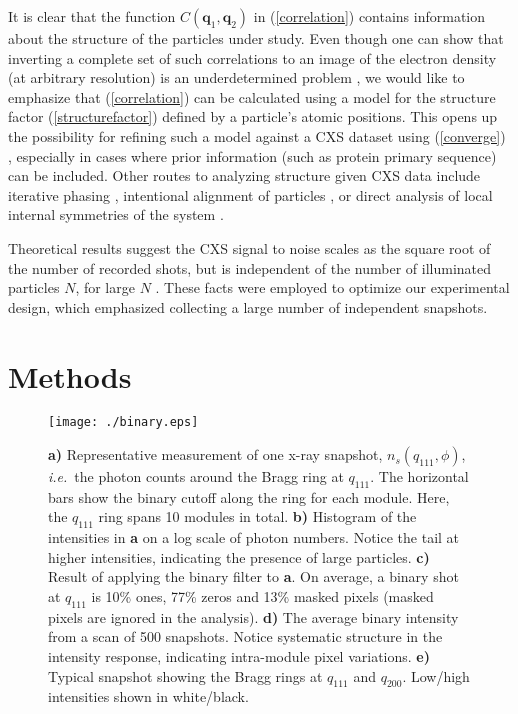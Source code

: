 \documentclass [11pt,fleqn]{article}
\begin{document}
It is clear that the function $C(\bm q_1, \bm q_2)$ in (\ref{correlation}) contains information about the structure of the particles under study. Even though one can show that inverting a complete set of such correlations to an image of the electron density (at arbitrary resolution) is an underdetermined problem \cite{Elser:2011ez}, we would like to emphasize that (\ref{correlation}) can be calculated using a model for the structure factor (\ref{structurefactor}) defined by a particle's atomic positions. This opens up the possibility for refining such a model against a CXS dataset using (\ref{converge}) \cite{Liu:2013dv, Chen:2013io, Saldin:2009jj}, especially in cases where prior information (such as protein primary sequence) can be included. Other routes to analyzing structure given CXS data include iterative phasing \cite{Saldin:2010bx}, intentional alignment of particles \cite{Poon:2013ia}, or direct analysis of local internal symmetries of the system \cite{Kurta:2012cb, Kurta:2013to}.


Theoretical results suggest the CXS signal to noise scales as the square root of the number of recorded shots, but is independent of the number of illuminated particles $N $, for large $N$ \cite{Kam:1977wc, Kam:1981ua, Kirian:2011bq}. These facts were employed to optimize our experimental design, which emphasized collecting a large number of independent snapshots.

\section{Methods}

\begin{figure}
\begin{center}
\texttt{[image: ./binary.eps]}
\end{center}
\caption { {\bf a)} Representative measurement of one x-ray snapshot, $n_{s}( q_{111},\phi)$, \textit{i.e.}~the photon counts around the Bragg ring at $q_{111}$. The horizontal bars show the binary cutoff along the ring for each module. Here, the $q_{111}$ ring spans 10 modules in total. {\bf b)} Histogram of the intensities in {\bf a} on a log scale of photon numbers. Notice the tail at higher intensities, indicating the presence of large particles. {\bf c)} Result of applying the binary filter to {\bf a}. On average, a binary shot at $q_{111}$ is 10\% ones, 77\% zeros and 13\% masked pixels (masked pixels are ignored in the analysis).  {\bf d)} The average binary intensity from a scan of 500 snapshots. Notice systematic structure in the intensity response, indicating intra-module pixel variations. {\bf e)} Typical snapshot showing the Bragg rings at $q_{111}$ and $q_{200}$. Low/high intensities shown in white/black.}
\label{fig:binary}
\end{figure}
\end{document}
